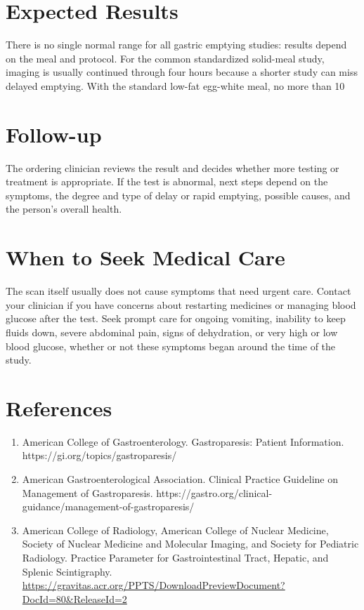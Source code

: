 \section*{Expected Results}
There is no single normal range for all gastric emptying studies: results depend on the meal and protocol. For the common standardized solid-meal study, imaging is usually continued through four hours because a shorter study can miss delayed emptying. With the standard low-fat egg-white meal, no more than 10%

\section*{Follow-up}
The ordering clinician reviews the result and decides whether more testing or treatment is appropriate. If the test is abnormal, next steps depend on the symptoms, the degree and type of delay or rapid emptying, possible causes, and the person's overall health.

\section*{When to Seek Medical Care}
The scan itself usually does not cause symptoms that need urgent care. Contact your clinician if you have concerns about restarting medicines or managing blood glucose after the test. Seek prompt care for ongoing vomiting, inability to keep fluids down, severe abdominal pain, signs of dehydration, or very high or low blood glucose, whether or not these symptoms began around the time of the study.

\section*{References}
\begin{enumerate}
  \item American College of Gastroenterology. Gastroparesis: Patient Information. https://gi.org/topics/gastroparesis/
  \item American Gastroenterological Association. Clinical Practice Guideline on Management of Gastroparesis. https://gastro.org/clinical-guidance/management-of-gastroparesis/
  \item American College of Radiology, American College of Nuclear Medicine, Society of Nuclear Medicine and Molecular Imaging, and Society for Pediatric Radiology. Practice Parameter for Gastrointestinal Tract, Hepatic, and Splenic Scintigraphy. \url{https://gravitas.acr.org/PPTS/DownloadPreviewDocument?DocId=80&ReleaseId=2}
\end{enumerate}

\clearpage
